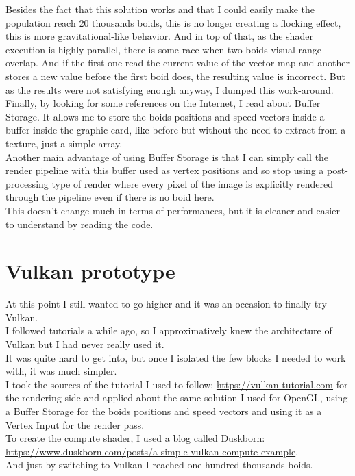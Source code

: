 \documentclass{article}
\begin{document}
Besides the fact that this solution works and that I could easily make the population reach 20 thousands boids, this is no longer creating a flocking effect, this is more gravitational-like behavior.
And in top of that, as the shader execution is highly parallel, there is some race when two boids visual range overlap. And if the first one read the current value of the vector map and another stores a new value before the first boid does, the resulting value is incorrect. But as the results were not satisfying enough anyway, I dumped this work-around.\\

Finally, by looking for some references on the Internet, I read about Buffer Storage. It allows me to store the boids positions and speed vectors inside a buffer inside the graphic card, like before but without the need to extract from a texture, just a simple array.\\
Another main advantage of using Buffer Storage is that I can simply call the render pipeline with this buffer used as vertex positions and so stop using a post-processing type of render where every pixel of the image is explicitly rendered through the pipeline even if there is no boid here.\\
This doesn't change much in terms of performances, but it is cleaner and easier to understand by reading the code.

\section{Vulkan prototype}
At this point I still wanted to go higher and it was an occasion to finally try Vulkan.\\
I followed tutorials a while ago, so I approximatively knew the architecture of Vulkan but I had never really used it.\\
It was quite hard to get into, but once I isolated the few blocks I needed to work with, it was much simpler.\\
I took the sources of the tutorial I used to follow: \url{https://vulkan-tutorial.com} for the rendering side and applied about the same solution I used for OpenGL, using a Buffer Storage for the boids positions and speed vectors and using it as a Vertex Input for the render pass.\\

To create the compute shader, I used a blog called Duskborn: \url{https://www.duskborn.com/posts/a-simple-vulkan-compute-example}.\\
And just by switching to Vulkan I reached one hundred thousands boids.\\
\end{document}
